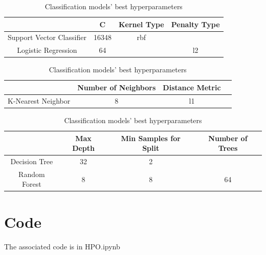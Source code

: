\documentclass[12pt, letterpaper]{article}
\begin{document}
\begin{table}[H]
\centering
\caption{Classification models' best hyperparameters}
\label{cls_table 1}
\begin{tabular}{c|c|c|c} %
                            & C         & Kernel Type   & Penalty Type \\ \hline
Support Vector Classifier   & 16348     & rbf \\
Logistic Regression         & 64        &               & l2 \\
\end{tabular}
\end{table}

\begin{table}[H]
\centering
\caption{Classification models' best hyperparameters}
\label{cls_table 2}
\begin{tabular}{c|c|c|c} %
                & Number of Neighbors & Distance Metric\\ \hline
K-Nearest Neighbor & 8 & l1 \\
\end{tabular}
\end{table}

\begin{table}[H]
\centering
\caption{Classification models' best hyperparameters}
\label{cls_table 3}
\begin{tabular}{c|c|c|c} %
                & Max Depth     & Min Samples for Split     & Number of Trees \\ \hline
Decision Tree   & 32 & 2 \\
Random Forest   & 8 & 8 & 64 \\
\end{tabular}
\end{table}

\section{Code} %

The associated code is in HPO.ipynb
\end{document}
